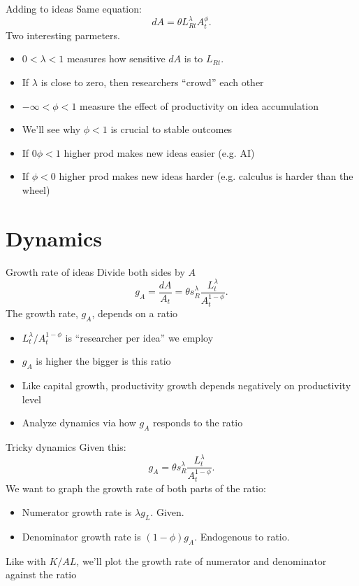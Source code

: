 \begin{frame}{Adding to ideas}
Same equation:
\begin{equation}
	dA = \theta L_{Rt}^{\lambda} A_t^{\phi}. \label{EQ_dotA}
\end{equation}
Two interesting parmeters. 
\begin{itemize}
	\item $0 < \lambda < 1$ measures how sensitive $dA$ is to $L_{Rt}$.
	\item If $\lambda$ is close to zero, then researchers ``crowd'' each other
	\item $-\infty < \phi < 1$ measure the effect of productivity on idea accumulation
	\item We'll see why $\phi < 1$ is crucial to stable outcomes
	\item If $0 \phi < 1$ higher prod makes new ideas easier (e.g. AI)
	\item If $\phi < 0$ higher prod makes new ideas harder (e.g. calculus is harder than the wheel)
\end{itemize}
\end{frame}

\section{Dynamics}
\begin{frame}{Growth rate of ideas}
Divide both sides by $A$
\begin{equation}
	g_A = \frac{dA}{A_t} = \theta s_R^{\lambda} \frac{L_t^{\lambda}}{A_t^{1-\phi}}. \label{EQ_gA}
\end{equation}
The growth rate, $g_A$, depends on a ratio 
\begin{itemize}
	\item $L_t^{\lambda}/A_t^{1-\phi}$ is ``researcher per idea'' we employ
	\item $g_A$ is higher the bigger is this ratio
	\item Like capital growth, productivity growth depends negatively on productivity level
	\item Analyze dynamics via how $g_A$ responds to the ratio
\end{itemize}
\end{frame}

\begin{frame}{Tricky dynamics}
Given this:
\begin{equation}
	g_A = \theta s_R^{\lambda} \frac{L_t^{\lambda}}{A_t^{1-\phi}}. \label{EQ_gA}
\end{equation}
We want to graph the growth rate of both parts of the ratio:
\begin{itemize}
	\item Numerator growth rate is $\lambda g_L$. Given.
	\item Denominator growth rate is $(1-\phi)g_A$. Endogenous to ratio.
\end{itemize}
Like with $K/AL$, we'll plot the growth rate of numerator and denominator against the ratio
\end{frame}

